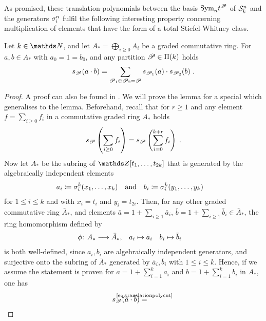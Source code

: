 As promised, these translation-polynomials between the basis
$\text{\normalfont Sym}_{n}t^{\mathscr{P}}$ of $\mathcal{S}^{n}_k$ and the generators $\sigma_{i}^{n}$
fulfil the following interesting property concerning
multiplication of elements that have the form of a total
Stiefel-Whitney class.
\begin{Lem}\label{lem:productrule:general}
  Let $k\in\Nat$, and let $A_*=\bigoplus_{i\geq 0} A_i$ be a graded
  commutative ring.
  For $a,b\in A_*$ with $a_0=1=b_0$, and any partition
  $\mathscr{P}\in\Pi({k})$ holds
  \begin{gather*}
    s_{\mathscr{P}}(a\cdot b)
    = \sum_{\mathscr{P}_1\oplus\mathscr{P}_2=\mathscr{P}}
    s_{\mathscr{P}_1}(a) \cdot s_{\mathscr{P}_2}(b)
    \;.
  \end{gather*}
  \begin{proof}
    A proof can also be found in
    \cite[Theorem~33, p.~91f]{milnorlectures}.
    We will prove the lemma for a special which generalises to
    the lemma.
    Beforehand, recall that for $r\geq 1$ and any
    element $f=\sum_{i\geq 0}f_i$ in a commutative graded ring $A_*$
    holds
    \begin{gather}\label{eq:translationpolycut}
      s_{\mathscr{P}}\left( \sum_{i\geq 0}f_i \right)
      = s_{\mathscr{P}}\left( \sum_{i=0}^{k+r}f_i \right)
      \;.
    \end{gather}
    Now let $A_*$ be the subring of $\Z[t_1,\dotsc,t_{2k}]$ that is
    generated by the algebraically independent elements
    \begin{align*}
      a_i&\coloneqq \sigma_{i}^{k}(x_1,\dotsc,x_k)
      &\text{and}&
      &b_i&\coloneqq \sigma_{i}^{k}(y_1,\dotsc,y_k)
    \end{align*}
    for $1\leq i\leq k$ and with $x_i=t_i$ and $y_i=t_{2i}$.
    Then, for any other graded commutative
    ring $\bar A_*$, and elements
    $\bar a=1+\sum_{i\geq 1}\bar a_i$,
    $\bar b=1+\sum_{i\geq 1}\bar b_i\in\bar A_*$, the ring
    homomorphism defined by
    \begin{align*}
      \phi\colon A_*&\longrightarrow \bar A_*,
      &a_i&\mapsto \bar a_i
      &b_i&\mapsto \bar b_i
    \end{align*}
    is both well-defined, since $a_i,b_i$ are algebraically independent
    generators, and surjective onto the subring of $\bar A_*$
    generated by $\bar a_i,\bar b_i$ with $1\leq i\leq k$.
    Hence, if we assume the statement is proven for
    $a=1+\sum_{i=1}^k a_i$ and $b=1+\sum_{i=1}^k b_i$ in $A_*$, one
    has
    \begin{align*}
      \s{\Part}(\bar a\cdot \bar b)
      &\cequalsby{\eqref{eq:translationpolycut}}

\end{align*}
\end{proof}
\end{Lem}
